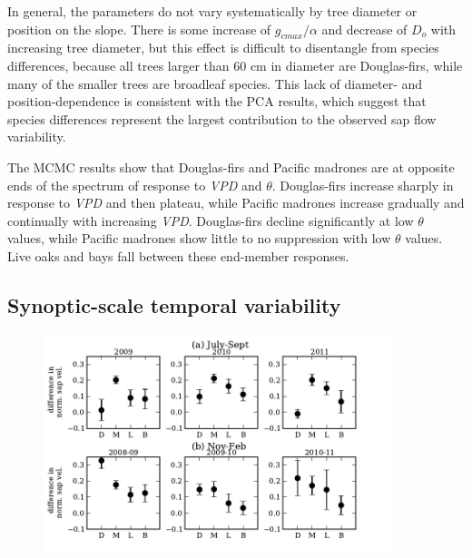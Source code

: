 In general, the parameters do not vary systematically by tree diameter or position on the slope.  There is some increase of $g_{cmax}/\alpha$ and decrease of $D_o$ with increasing tree diameter, but this effect is difficult to disentangle from species differences, because all trees larger than 60 cm in diameter are Douglas-firs, while many of the smaller trees are broadleaf species.  This lack of diameter- and position-dependence is consistent with the PCA results, which suggest that species differences represent the largest contribution to the observed sap flow variability.

The MCMC results show that Douglas-firs and Pacific madrones are at opposite ends of the spectrum of response to \textit{VPD} and $\theta$.  Douglas-firs increase sharply in response to \textit{VPD} and then plateau, while Pacific madrones increase gradually and continually with increasing \textit{VPD}.  Douglas-firs decline significantly at low $\theta$ values, while Pacific madrones show little to no suppression with low $\theta$ values.  Live oaks and bays fall between these end-member responses.

\subsection{Synoptic-scale temporal variability}

\begin{figure}[here]
\includegraphics[width=0.9\textwidth]{ch1-sapflow/figures/Figure08.pdf}
\caption{}
\label{fig:sapflow_synoptic}
\end{figure}

